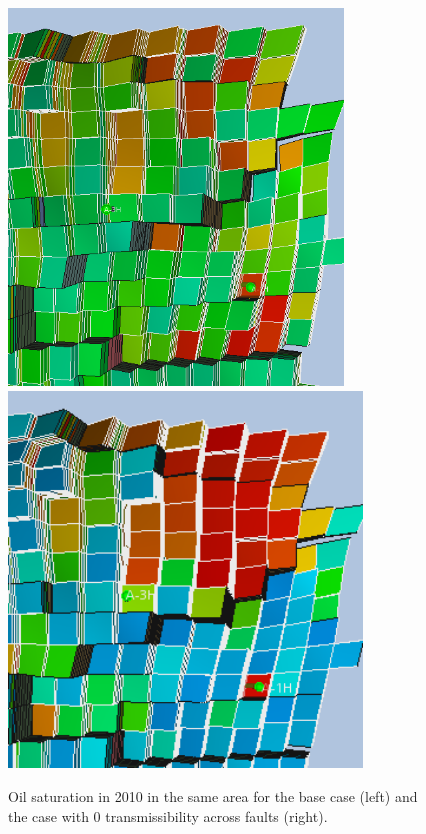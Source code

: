 \documentclass[final]{beamer}
\begin{document}
\begin{frame}[t]
\begin{multicols}{3}
\begin{figure}[ht]
  
  \caption{}
  \label{fig:faults_opr}
\end{figure}


\begin{figure}[H]
  \begin{center}
    \includegraphics[clip=true, width=0.5\columnwidth, height=10cm]{images/soil_2010_base.png}
    \includegraphics[clip=true, width=0.5\columnwidth, height=10cm]{images/soil_2010_multfl_0.png}
  \end{center}
  \caption{Oil saturation in 2010 in the same area for the base case (left) and the case with 0 transmissibility across faults (right).}
  \label{fig:faults_3d}
\end{figure}




\end{multicols}
\end{frame}
\end{document}
